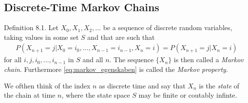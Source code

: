
\subsection{Discrete-Time Markov Chains}
\begin{boks}{Definition 8.1.}
  Let $X_0, X_1, X_2, \ldots$ be a sequence of discrete random variables, taking values in some set $S$ and that are such that
  \begin{align}\label{eq:markov_egenskaben}
    P(X_{n + 1} = j | X_0 = i_0, \ldots, X_{n - 1} = i_{n - 1}, X_n = i) =
    P(X_{n + 1} = j | X_n = i)
  \end{align}
  for all $i, j, i_0, \ldots, i_{n - 1}$ in $S$ and all $n$. The sequence $\{ X_n \}$ is then called a \textit{Markov chain}. Furthermore \eqref{eq:markov_egenskaben} is called the \textit{Markov property}.
\end{boks}
We ofthen think of the index $n$ as discrete time and say that $X_n$ is the \textit{state} of the chain at time $n$, where the state space $S$ may be finite or coutably infinte.

